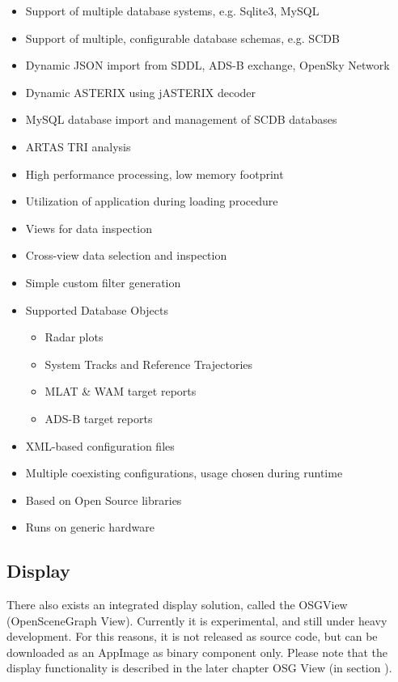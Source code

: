 \begin{itemize}  
\item Support of multiple database systems, e.g. Sqlite3, MySQL
\item Support of multiple, configurable database schemas, e.g. SCDB
\item Dynamic JSON import from SDDL, ADS-B exchange, OpenSky Network
\item Dynamic ASTERIX using jASTERIX decoder
\item MySQL database import and management of SCDB databases
\item ARTAS TRI analysis
\item High performance processing, low memory footprint
\item Utilization of application during loading procedure
\item Views for data inspection
\item Cross-view data selection and inspection
\item Simple custom filter generation
\item Supported Database Objects
\begin{itemize}  
\item Radar plots
\item System Tracks and Reference Trajectories
\item MLAT \& WAM target reports
\item ADS-B target reports
\end{itemize}
\item XML-based configuration files
\item Multiple coexisting configurations, usage chosen during runtime
\item Based on Open Source libraries
\item Runs on generic hardware
\end{itemize}

\subsection{Display}
There also exists an integrated display solution, called the OSGView (OpenSceneGraph View). Currently it is experimental, and still under heavy development. For this reasons, it is not released as source code, but can be downloaded as an AppImage as binary component only. Please note that the display functionality is described in the later chapter OSG View (in section ).\\\\

